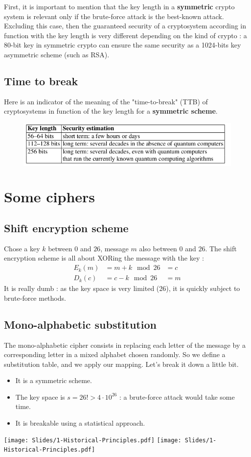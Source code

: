 \documentclass[a4paper, 12pt]{book}
\begin{document}
First, it is important to mention that the key length in a \textbf{symmetric} crypto system is relevant only if the brute-force attack is the best-known attack. \\

Excluding this case, then the guaranteed security of a cryptosystem according in function with the key length is very different depending on the kind of crypto : a 80-bit key in symmetric crypto can ensure the same security as a 1024-bits key asymmetric scheme (such as RSA).

\subsection{Time to break}
Here is an indicator of the meaning of the "time-to-break" (TTB) of cryptosystems in function of the key length for a \textbf{symmetric scheme}.
\begin{figure}[h]
    \centering
    \includegraphics[width=0.7\linewidth]{images/1-TTB.png}
\end{figure}
\section{Some ciphers}
\subsection{Shift encryption scheme}
Chose a key $k$ between $0$ and $26$, message $m$ also between $0$ and $26$. The shift encryption scheme is all about XORing the message with the key :
$$
\begin{array}{lll}
    E_k(m) &= m + k \mod{26} &= c \\
    D_k(c) &= c - k \mod{26} &= m
\end{array}$$
It is really dumb : as the key space is very limited ($26$), it is quickly subject to brute-force methods.
\subsection{Mono-alphabetic substitution}
The mono-alphabetic cipher consists in replacing each letter of the message by a corresponding letter in a mixed alphabet chosen randomly. So we define a substitution table, and we apply our mapping. Let's break it down a little bit.
\begin{itemize}
    \item It is a symmetric scheme.
    \item The key space is $s = 26! > 4\cdot 10 ^{26}$ : a brute-force attack would take some time.
    \item It is breakable using a statistical approach.
\end{itemize}
\begin{center}
    \texttt{[image: Slides/1-Historical-Principles.pdf]}
    \texttt{[image: Slides/1-Historical-Principles.pdf]}
\end{center}
\end{document}
